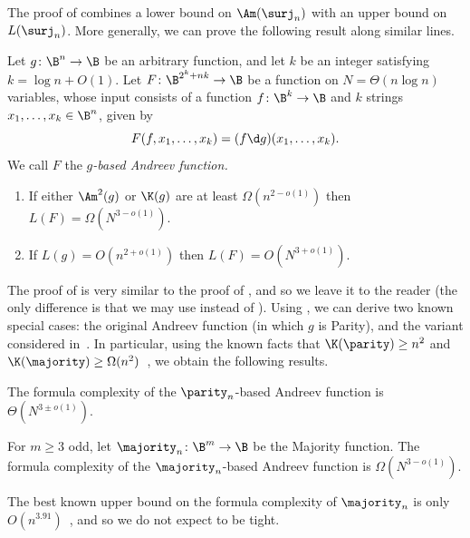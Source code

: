\documentclass{toc}
\begin{document}
The proof of  combines a lower bound on $\Am(\surj_{n})$
with an upper bound on $L(\surj_{n})$. More generally, we can prove
the following result along similar lines. 
\begin{theorem}
\label{thm:andreev-general}Let $g\colon\B^{n}\to\B$ be an arbitrary
function, and let $k$ be an integer satisfying $k=\log n+O(1)$.
Let $F\colon\B^{2^{k}+nk}\to\B$ be a function on $N=\Theta(n\log n)$
variables, whose input consists of a function $f\colon\B^{k}\to\B$
and $k$ strings $x_{1},\ldots,x_{k}\in\B^{n}$, given by 
\[
F(f,x_{1},\ldots,x_{k})=(f\d g)(x_{1},\ldots,x_{k}).
\]
We call $F$ the \emph{$g$-based Andreev function.} 
\begin{enumerate}
\item If either $\Am^{2}(g)$ or $\K(g)$ are at least $\Omega(n^{2-o(1)})$
then $L(F)=\Omega(N^{3-o(1)})$. 
\item If $L(g)=O(n^{2+o(1)})$ then $L(F)=O(N^{3+o(1)})$. 
\end{enumerate}
\end{theorem}

The proof of  is very similar to the proof
of , and so we leave it to the reader (the only difference
is that we may use  instead of ).
Using , we can derive two known special
cases: the original Andreev function (in which $g$ is Parity), and
the variant considered in~\cite{GTN19}. In particular, using the
known facts that $\K(\parity)\ge n^{2}$ and $\K(\majority)\ge\Omega(n^{2})$~\cite{K72},
we obtain the following results. 
\begin{corollary}
\label{cor:parity}The formula complexity of the $\parity_{n}$-based
Andreev function is $\Theta(N^{3\pm o(1)})$. 
\end{corollary}

\begin{corollary}
\label{cor:majority} For $m\geq3$ odd, let $\majority_{n}\colon\B^{m}\to\B$
be the Majority function. The formula complexity of the $\majority_{n}$-based
Andreev function is $\Omega(N^{3-o(1)})$. 
\end{corollary}

The best known upper bound on the formula complexity of $\majority_{n}$
is only $O(n^{3.91})$~\cite{S16}, and so we do not expect 
 to be tight.

%
\end{document}

